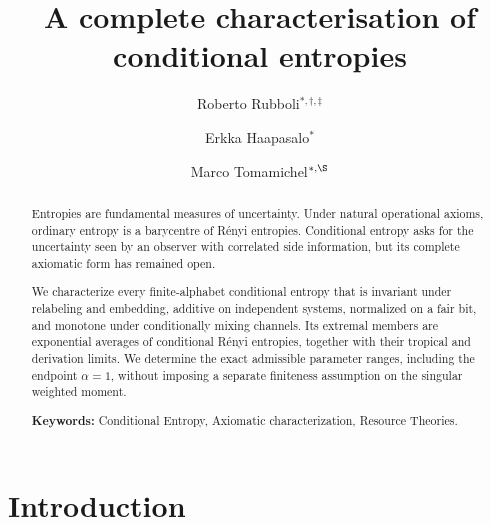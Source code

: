 \documentclass[aps,pra,11pt,onecolumn,nofootinbib,tightenlines]{revtex4-2}
\theoremstyle{definition}
\begin{document}
\title{\Large A complete characterisation of conditional entropies}

\begin{abstract}
Entropies are fundamental measures of uncertainty.  Under natural operational
axioms, ordinary entropy is a barycentre of R\'enyi entropies.  Conditional
entropy asks for the uncertainty seen by an observer with correlated side
information, but its complete axiomatic form has remained open.

We characterize every finite-alphabet conditional entropy that is invariant
under relabeling and embedding, additive on independent systems, normalized on
a fair bit, and monotone under conditionally mixing channels.  Its extremal
members are exponential averages of conditional R\'enyi entropies, together
with their tropical and derivation limits.  We determine the exact admissible
parameter ranges, including the endpoint $\alpha=1$, without imposing a
separate finiteness assumption on the singular weighted moment.

\noindent\textbf{Keywords:} Conditional Entropy, Axiomatic characterization, Resource Theories.

\end{abstract}

\author{Roberto Rubboli$^{*,\dagger,\ddagger}$}
\author{Erkka Haapasalo$^{*}$}
\author{Marco Tomamichel$^{*,\S}$}
\noaffiliation

\maketitle


\begingroup
\renewcommand{\thefootnote}{\fnsymbol{footnote}}

{} %
{}                         %

\endgroup


\section{Introduction}
\end{document}

